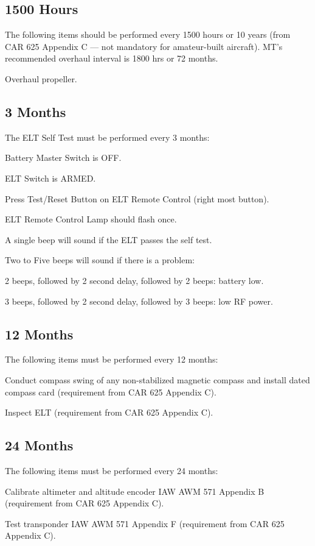 \subsection{1500 Hours} The following items should be performed every 1500 hours or 10 years (from CAR 625 Appendix C --- not mandatory for amateur-built aircraft). MT's recommended overhaul interval is 1800 hrs or 72 months.
\begin{enumerate*}
	\item Overhaul propeller. 
\end{enumerate*}

\subsection{3 Months} The ELT Self Test must be performed every 3 months:
\begin{enumerate*}
	\item Battery Master Switch is OFF.
	\item ELT Switch is ARMED.
	\item Press Test/Reset Button on ELT Remote Control (right most button).
	\item ELT Remote Control Lamp should flash once.
	\item A single beep will sound if the ELT passes the self test.
	\item Two to Five beeps will sound if there is a problem:
	\begin{enumerate*}
	  \item 2 beeps, followed by 2 second delay, followed by 2 beeps: battery low.
	  \item 3 beeps, followed by 2 second delay, followed by 3 beeps: low RF power.
	  \end{enumerate*}
\end{enumerate*}

\subsection{12 Months} The following items must be performed every 12 months:
\begin{enumerate*}
	\item Conduct compass swing of any non-stabilized magnetic compass and install dated compass card (requirement from CAR 625 Appendix C).
	\item Inspect ELT (requirement from CAR 625 Appendix C).
\end{enumerate*}

\subsection{24 Months} The following items must be performed every 24 months:
\begin{enumerate*}
	\item Calibrate altimeter and altitude encoder IAW AWM 571 Appendix B (requirement from CAR 625 Appendix C).
	\item Test transponder IAW AWM 571 Appendix F (requirement from CAR 625 Appendix C).
\end{enumerate*}

